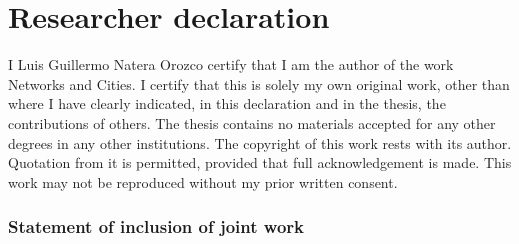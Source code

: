 \documentclass[a4paper,twoside,12pt]{book}
\begin{document}
\newpage


\chapter*{Researcher declaration}
I Luis Guillermo Natera Orozco certify that I am the author of the work Networks and Cities. I certify that this is solely my own original work, other than where I have clearly indicated, in this declaration and in the thesis, the contributions of others. The thesis contains no materials accepted for any other degrees in any other institutions.  The copyright of this work rests with its author. Quotation from it is permitted, provided that full acknowledgement is made. This work may not be reproduced without my prior written consent.

\subsection*{Statement of inclusion of joint work}

\vspace{.2cm}



\vspace{.2cm}

\noindent
\end{document}
